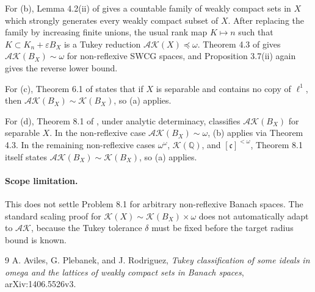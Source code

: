 \documentclass[11pt]{article}
\newcommand{\AK}{\mathcal{AK}}
\newcommand{\cK}{\mathcal{K}}
\newcommand{\pre}{\preceq}
\newcommand{\om}{\omega}
\newcommand{\con}{\mathfrak{c}}
\begin{document}
For (b), Lemma 4.2(ii) of \cite{APR} gives a countable family of weakly compact
sets in \(X\) which strongly generates every weakly compact subset of \(X\).
After replacing the family by increasing finite unions, the usual rank map
\(K\mapsto n\) such that \(K\subset K_n+\varepsilon B_X\) is a Tukey reduction
\(\AK(X)\pre\om\).  Theorem 4.3 of \cite{APR} gives
\(\AK(B_X)\sim\om\) for non-reflexive SWCG spaces, and Proposition 3.7(ii)
again gives the reverse lower bound.

For (c), Theorem 6.1 of \cite{APR} states that if \(X\) is separable and
contains no copy of \(\ell^1\), then \(\AK(B_X)\sim\cK(B_X)\), so (a) applies.

For (d), Theorem 8.1 of \cite{APR}, under analytic determinacy, classifies
\(\AK(B_X)\) for separable \(X\).  In the non-reflexive case \(\AK(B_X)\sim
\om\), (b) applies via Theorem 4.3.  In the remaining non-reflexive cases
\(\om^\om\), \(\cK(\mathbb Q)\), and \([\con]^{<\om}\), Theorem 8.1 itself
states \(\AK(B_X)\sim\cK(B_X)\), so (a) applies.

\paragraph{Scope limitation.}
This does not settle Problem 8.1 for arbitrary non-reflexive Banach spaces.
The standard scaling proof for \(\cK(X)\sim\cK(B_X)\times\om\) does not
automatically adapt to \(\AK\), because the Tukey tolerance \(\delta\) must be
fixed before the target radius bound is known.

\begin{thebibliography}{9}
A. Aviles, G. Plebanek, and J. Rodriguez,
\emph{Tukey classification of some ideals in omega and the lattices of weakly
compact sets in Banach spaces}, arXiv:1406.5526v3.
\end{thebibliography}
\end{document}
